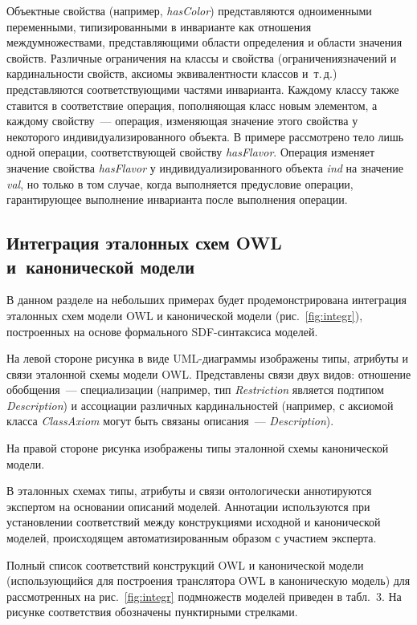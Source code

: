 \begin{multicols}{2}
Объектные свойства (например, {\it hasColor}) представляются
одноименными переменными, типизированными в инварианте как отношения
между\linebreak множествами, представляющими области определения и области значения
свойств.
Различные ограничения на классы и свойства (ограничения\linebreak значений и кардинальности
свойств, аксиомы эквивалентности классов и~т.\,д.)
представляются соответствующими частями инварианта.
Каждому классу также ставится в соответствие операция, пополняющая
класс новым элементом, а каждому свойству~--- операция,
изменяющая значение этого свойства у некоторого индивидуализированного объекта.
В примере рассмотрено тело лишь одной операции, соответствующей
свойству {\it hasFlavor}. Операция изменяет значение свойства {\it hasFlavor}
у индивидуализированного объекта {\it ind} на значение {\it val}, но только в том случае,
когда выполняется предусловие операции, гарантирующее выполнение
инварианта после выполнения опе\-рации.
{

}

\subsection{Интеграция эталонных схем OWL и~канонической модели}
В данном разделе на небольших примерах будет продемонстрирована
интеграция эталонных схем модели OWL и канонической модели (рис.~\ref{fig:integr}),
построенных на основе формального SDF-синтаксиса моделей.

На левой стороне рисунка в виде UML-диа\-грам\-мы изображены типы,
атрибуты и связи эталонной схемы модели OWL.
Представлены связи двух видов: отношение обобщения~--- специализации
(например, тип {\it Restriction} является подтипом {\it Description})
и ассоциации различных кардинальностей (например,
с аксиомой класса {\it ClassAxiom} могут быть связаны
описания~--- {\it Description}).

На правой стороне рисунка изображены типы
эталонной схемы канонической модели.

В эталонных схемах типы, атрибуты и связи онтологически
аннотируются экспертом на основании описаний моделей.
Аннотации используются при установлении соответствий между
конструкциями исходной и канонической моделей,
происходящем автоматизированным образом с участием эксперта.


Полный список соответствий конструкций OWL и канонической модели
(использующийся для построения транслятора OWL в каноническую модель)
для рассмотренных на рис.~\ref{fig:integr}
подмножеств моделей приведен в табл.~3.
На рисунке соответствия обозначены пунктирными стрелками.


\end{multicols}

